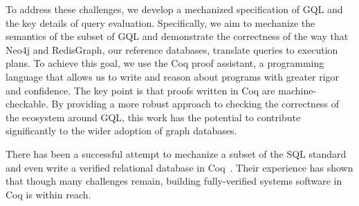 \documentclass[14pt]{constructor-thesis}
\theoremstyle{definition}
\begin{document}
To address these challenges, we develop a mechanized specification of GQL and the key details of query evaluation. Specifically, we aim to mechanize the semantics of the subset of GQL and demonstrate the correctness of the way that Neo4j and RedisGraph, our reference databases, translate queries to execution plans. To achieve this goal, we use the Coq proof assistant, a programming language that allows us to write and reason about programs with greater rigor and confidence. The key point is that proofs written in Coq are machine-checkable. By providing a more robust approach to checking the correctness of the ecosystem around GQL, this work has the potential to contribute significantly to the wider adoption of graph databases.

There has been a successful attempt to mechanize a subset of the SQL standard~\cite{sql-in-coq} and even write a verified relational database in Coq~\cite{rdbms-in-coq}. Their experience has shown that though many challenges remain, building fully-verified systems software in Coq is within reach.






\end{document}
